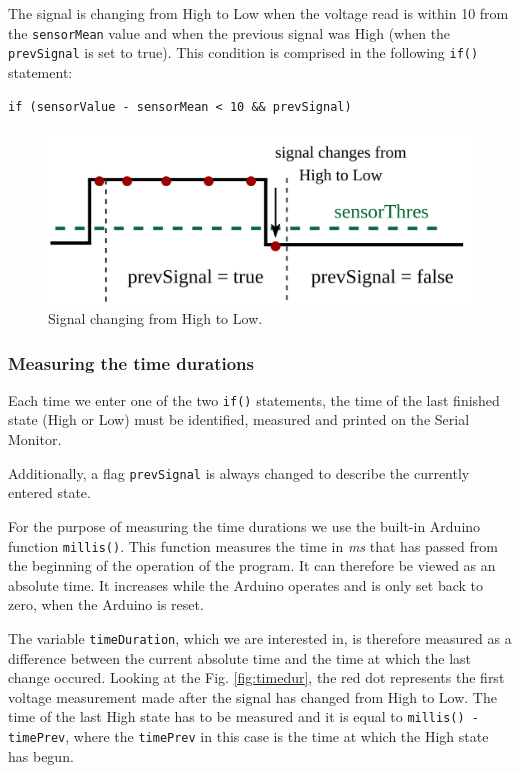 \documentclass[12pt]{report}
\begin{document}
The signal is changing from High to Low when the voltage read is within 10 from the \verb|sensorMean| value and when the previous signal was High (when the \verb|prevSignal| is set to true). This condition is comprised in the following \verb|if()| statement:

\begin{lstlisting}
if (sensorValue - sensorMean < 10 && prevSignal)
\end{lstlisting}

\begin{figure}[H]
\centering\includegraphics[scale=0.18]{hightolow}
\caption{Signal changing from High to Low.}				
\label{fig:arduino_code}
\end{figure}

\subsubsection{Measuring the time durations}

Each time we enter one of the two \verb|if()| statements, the time of the last finished state (High or Low) must be identified, measured and printed on the Serial Monitor.

Additionally, a flag \verb|prevSignal| is always changed to describe the currently entered state.

For the purpose of measuring the time durations we use the built-in Arduino function \verb|millis()|. This function measures the time in \textit{ms} that has passed from the beginning of the operation of the program. It can therefore be viewed as an absolute time. It increases while the Arduino operates and is only set back to zero, when the Arduino is reset.

The variable \verb|timeDuration|, which we are interested in, is therefore measured as a difference between the current absolute time and the time at which the last change occured. Looking at the Fig. \ref{fig:timedur}, the red dot represents the first voltage measurement made after the signal has changed from High to Low. The time of the last High state has to be measured and it is equal to \verb|millis() - timePrev|, where the 
\textcolor{cadr}{\texttt{timePrev}} in this case is the time at which the High state has begun.
\end{document}
